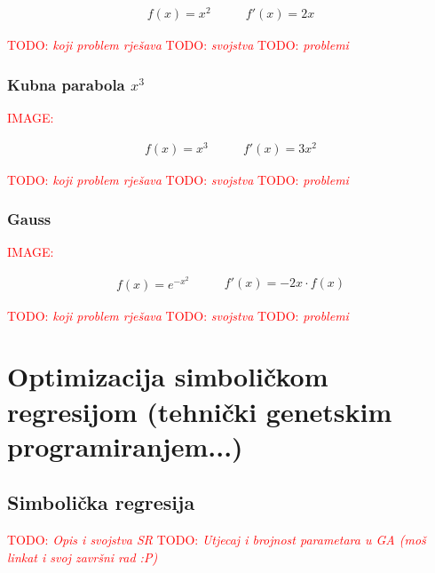 \documentclass[times, utf8, diplomski]{fer}
\def\TODO#1{\noindent\textcolor{red}{TODO: \textit{#1}}\newline}
\def\todo#1{\TODO{#1}}
\def\todoimg#1{\begin{center} \textcolor{red}{IMAGE: \textit{#1}} \end{center}}
\begin{document}
\begin{equation}
\begin{split}
f(x) = x^2
\end{split}
\qquad
\begin{split}
f'(x) = 2x
\end{split}
\end{equation}

\todo{koji problem rješava}
\todo{svojstva}
\todo{problemi}

\subsection*{Kubna parabola $x^3$}

\todoimg{}

\begin{equation}
\begin{split}
f(x) = x^3
\end{split}
\qquad
\begin{split}
f'(x) = 3x^2
\end{split}
\end{equation}

\todo{koji problem rješava}
\todo{svojstva}
\todo{problemi}

\subsection*{Gauss}

\todoimg{}

\begin{equation}
\begin{split}
f(x) = e^{-x^2}
\end{split}
\qquad
\begin{split}
f'(x) = -2x \cdot f(x)
\end{split}
\end{equation}

\todo{koji problem rješava}
\todo{svojstva}
\todo{problemi}

\chapter{Optimizacija simboličkom regresijom (tehnički genetskim programiranjem...)}

\section{Simbolička regresija}
\todo{Opis i svojstva SR}
\todo{Utjecaj i brojnost parametara u GA (moš linkat i svoj završni rad :P)}
\end{document}
